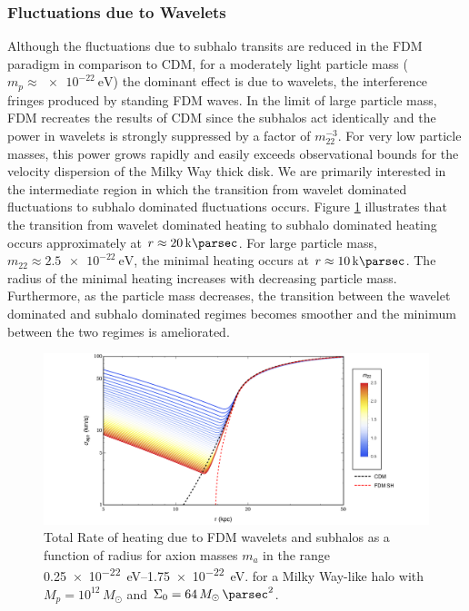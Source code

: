 \documentclass[usenatbib]{mnras}
\begin{document}
\subsubsection{Fluctuations due to Wavelets}

Although the fluctuations due to subhalo transits are reduced in the FDM paradigm in comparison to CDM, for a moderately light particle mass ($m_p \approx \SI{e-22}{\electronvolt}$) the dominant effect is due to wavelets, the interference fringes produced by standing FDM waves. In the limit of large particle mass, FDM recreates the results of CDM since the subhalos act identically and the power in wavelets is strongly suppressed by a factor of $m_{22}^{-3}$. For very low particle masses, this power grows rapidly and easily exceeds observational bounds for the velocity dispersion of the Milky Way thick disk. We are primarily interested in the intermediate region in which the transition from wavelet dominated fluctuations to subhalo dominated fluctuations occurs. Figure \ref{fig:radiusheating} illustrates that the transition from wavelet dominated heating to subhalo dominated heating occurs approximately at $r \approx \SI{20}{\kilo \parsec}$. For large particle mass, $m_{22} \approx \SI{2.5e-22}{\electronvolt}$, the minimal heating occurs at $r \approx \SI{10}{\kilo \parsec}$. The radius of the minimal heating increases with decreasing particle mass. Furthermore, as the particle mass decreases, the transition between the wavelet dominated and subhalo dominated regimes becomes smoother and the minimum between the two regimes is ameliorated.   


\begin{figure}
\includegraphics[width=17cm]{FDM_velocity}
\caption{Total Rate of heating due to FDM wavelets and subhalos as a function of radius for axion masses $m_{a}$ in the range \SIrange{0.25 e-22}{ 1.75 e-22}{\electronvolt}. for a Milky Way-like halo with $M_p = 10^{12} \, M_\odot$ and $\Sigma_0 = 64 \, M_\odot \, \si{\per\parsec^2}$.}
\label{fig:radiusheating}
\end{figure}
\end{document}
